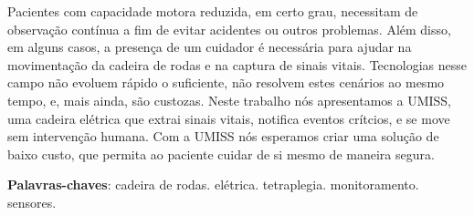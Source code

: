 \begin{resumo}

Pacientes com capacidade motora reduzida, em certo grau, necessitam de
observação contínua a fim de evitar acidentes ou outros problemas. Além
disso, em alguns casos, a presença de um cuidador é necessária para ajudar na
movimentação da cadeira de rodas e na captura de sinais vitais.
Tecnologias nesse campo não evoluem rápido o suficiente, não resolvem estes
cenários ao mesmo tempo, e, mais ainda, são custozas.
Neste trabalho nós apresentamos a UMISS, uma cadeira elétrica que extrai sinais
vitais, notifica eventos crítcios, e se move sem intervenção humana.
Com a UMISS nós esperamos criar uma solução de baixo custo, que permita ao
paciente cuidar de si mesmo de maneira segura.

 \vspace{\onelineskip}
    
 \noindent
 \textbf{Palavras-chaves}: cadeira de rodas. elétrica. tetraplegia. monitoramento. sensores.
\end{resumo}

